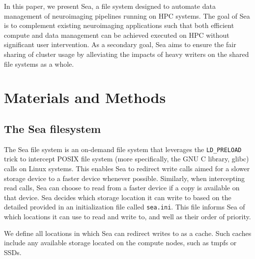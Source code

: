     In this paper, we present Sea, a file system designed to automate data
    management of neuroimaging pipelines running on HPC systems. The goal of Sea
    is to complement existing neuroimaging applications such that both efficient
    compute and data management can be achieved executed on HPC without
    significant user intervention. As a secondary goal, Sea aims to ensure the
    fair sharing of cluster usage by alleviating the impacts of heavy writers on
    the shared file systems as a whole. 
    
    
    
    
    
    
    \section{Materials and Methods}
    
    \subsection{The Sea filesystem}
    
    The Sea file system is an on-demand file system that leverages the \texttt{LD\_PRELOAD} trick to intercept POSIX file system (more specifically, the GNU C library, glibc)
    calls on Linux systems. This enables Sea to redirect write calls aimed for a slower storage device to a faster device whenever
    possible. Similarly, when intercepting read calls, Sea can choose to read from a faster device if a copy is available on that device.
    Sea decides which storage location it can write to based on the detailed provided in an initialization file called \texttt{sea.ini}. 
    This file informs Sea of which locations it can use to read and write to, and well as their order of priority.

    We define all locations in which Sea can redirect writes to as a cache. Such caches include any available
    storage located on the compute nodes, such as tmpfs or SSDs. 

